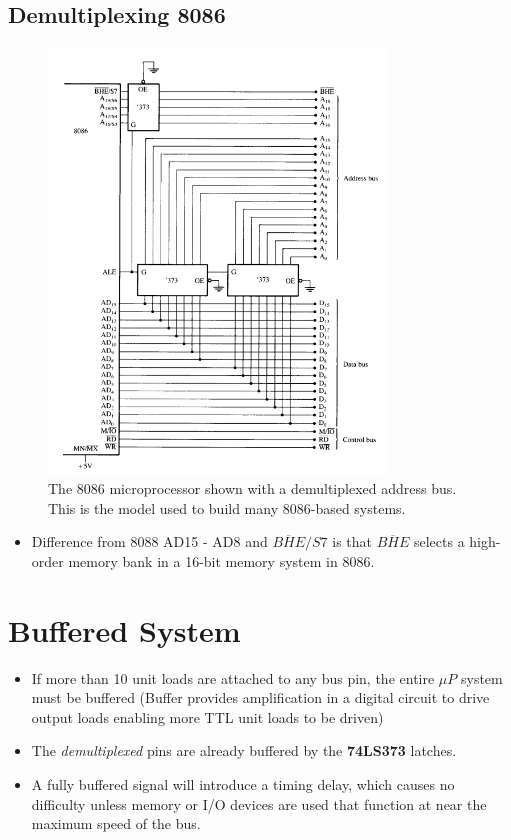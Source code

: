 \subsection{Demultiplexing 8086}
\begin{figure}[h!]
  \includegraphics[width = 0.8\textwidth]{./figures/8086_demux.png}
  \caption{The 8086 microprocessor shown with a demultiplexed address bus. This is the
model used to build many 8086-based systems.}
  \label{}
\end{figure}
\begin{itemize}
  \item Difference from 8088 AD15 - AD8 and $\overline{BHE}/S7$ is that $\overline{BHE}$ selects a high-order memory bank in a 16-bit memory system in 8086.
\end{itemize}
\newpage
\section{Buffered System }
\begin{itemize}
  \item If more than 10 unit loads are attached to any bus pin, the entire $\mu P$ system must be buffered (Buffer provides amplification in a digital circuit to drive output loads enabling more TTL unit loads to be driven)
  \item The \textit{demultiplexed} pins are already buffered by the \textbf{74LS373} latches.
  \item A fully buffered signal will introduce a timing delay, which causes no difficulty unless memory or I/O devices are used that function at near the maximum speed of the bus.
\end{itemize}

